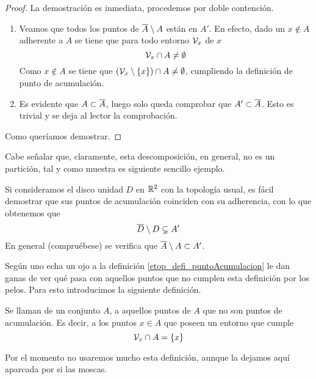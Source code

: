 \begin{proof}
	La demostración es inmediata, procedemos por doble contención.
	\begin{enumerate}
		\item[\bsubset] Veamos que todos los puntos de $\overline{A}\setminus A$ están en $A'$. En efecto, dado un $x\not\in A$ adherente a $A$ se tiene que para todo entorno $\mathcal{V}_x$ de $x$
		\begin{equation*}
		\mathcal{V}_x\cap A\not=\emptyset
		\end{equation*}
		Como $x\not\in A$ se tiene que $(\mathcal{V}_x\setminus\{x\})\cap A\not=\emptyset$, cumpliendo la definición de punto de acumulación.
		\item[\bsupset] Es evidente que $A\subset\overline{A}$, luego solo queda comprobar que $A'\subset \overline{A}$. Esto es trivial y se deja al lector la comprobación.
	\end{enumerate}
	Como queríamos demostrar.
\end{proof}
Cabe señalar que, claramente, esta descomposición, en general, no es un partición, tal y como muestra es siguiente sencillo ejemplo.
\begin{exa}[Disco]
	Si consideramos el disco unidad $D$ en $\mathbb{R}^2$ con la topología usual, es fácil demostrar que sus puntos de acumulación coinciden con su adherencia, con lo que obtenemos que
	\begin{equation}
	\overline{D}\setminus D \subsetneq A'
	\end{equation}
	En general (compruébese) se verifica que $\overline{A}\setminus A\subset A'$.
\end{exa}
Según uno echa un ojo a la definición \ref{etop_defi_puntoAcumulacion} le dan ganas de ver qué pasa con aquellos puntos que no cumplen esta definición por los pelos. Para esto introducimos la siguiente definición.
\begin{defi}
	Se llaman  de un conjunto $A$, a aquellos puntos de $A$ que no son puntos de acumulación. Es decir, a los puntos $x\in A$ que poseen un entorno que cumple
	\begin{equation*}
	\mathcal{V}_x\cap A = \{x\}
	\end{equation*}
\end{defi}
Por el momento no usaremos mucho esta definición, aunque la dejamos aquí aparcada por si las moscas.

